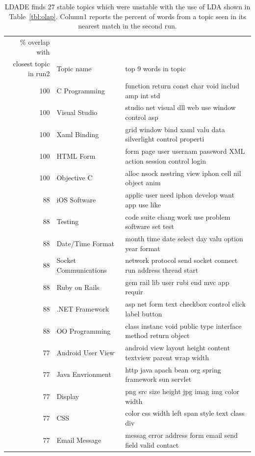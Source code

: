\documentclass[twocolumn,5p,sort&compress]{elsarticle}
\theoremstyle{break}
\begin{document}
  \begin{table}[!t]
\renewcommand{\baselinestretch}{0.75}
\begin{center}
\footnotesize
\caption{LDADE finds 27 stable topics which were unstable with the use of LDA shown in Table~\ref{tbl:olap}. Column1 reports the percent
of words from a topic seen in its nearest match in the second run.}
\label{tbl:olap_stable}
\begin{tabular}{r|l|l}
\% overlap with & &\\
closest topic in run2  & Topic name & top 9 words in topic\\\hline
100 &C Programming & function return const char void includ amp int std\\
100 &Visual Studio & studio net visual dll web use window control asp\\
100 &Xaml Binding & grid window bind xaml valu data silverlight control properti\\
100 &HTML Form & form page user usernam password XML action session control login\\
100 &Objective C & alloc nsock nsstring view iphon cell nil object anim\\
88 &iOS Software & applic user need iphon develop want app use like\\
88 &Testing & code suite chang work use problem software set test\\
88 &Date/Time Format & month time date select day valu option year format\\
88 &Socket Communications & network protocol send socket connect run address thread start \\
88 & Ruby on Rails & gem rail lib user rubi end mvc app requir  \\
88 &.NET Framework & asp net form text checkbox control click label button\\
88 &OO Programming & class instanc void public type interface method return object\\
77 &Android User View & android view layout height content textview parent wrap width\\
77 &Java Envrionment & http java apach bean org spring framework sun servlet \\
77 &Display & png src size height jpg imag img color width\\
77 & CSS & color css width left span style text class div\\
77 &Email Message & messag error address form email send field  valid contact\\

\end{tabular}
\end{center}
\end{table}
\end{document}
